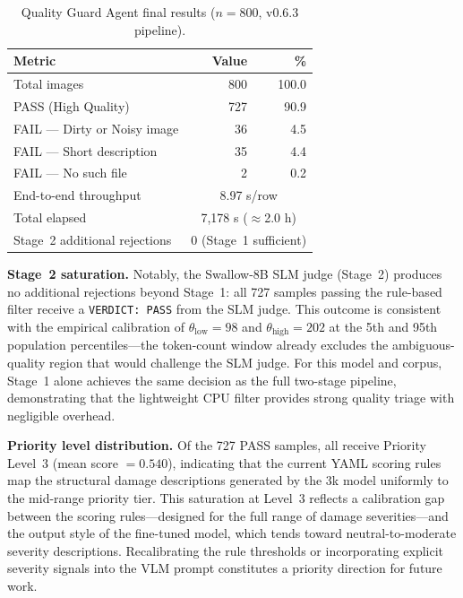 \documentclass[twocolumn]{article}
\begin{document}
\begin{table}[h]
\centering
\caption{Quality Guard Agent final results ($n=800$, v0.6.3 pipeline).}
\label{tab:qg_final}
\setlength{\tabcolsep}{4pt}
\begin{tabular}{lrr}
\toprule
\textbf{Metric} & \textbf{Value} & \textbf{\%} \\
\midrule
Total images                    & 800 & 100.0 \\
PASS (High Quality)             & 727 &  90.9 \\
FAIL --- Dirty or Noisy image   &  36 &   4.5 \\
FAIL --- Short description      &  35 &   4.4 \\
FAIL --- No such file           &   2 &   0.2 \\
\midrule
End-to-end throughput & \multicolumn{2}{c}{8.97 s/row} \\
Total elapsed         & \multicolumn{2}{c}{7{,}178 s ($\approx$2.0 h)} \\
Stage~2 additional rejections & \multicolumn{2}{c}{0 (Stage~1 sufficient)} \\
\bottomrule
\end{tabular}
\end{table}

\textbf{Stage~2 saturation.}
Notably, the Swallow-8B SLM judge (Stage~2) produces no additional
rejections beyond Stage~1: all 727 samples passing the rule-based
filter receive a \texttt{VERDICT: PASS} from the SLM judge.
This outcome is consistent with the empirical calibration of
$\theta_{\text{low}}=98$ and $\theta_{\text{high}}=202$ at the
5th and 95th population percentiles---the token-count window already
excludes the ambiguous-quality region that would challenge the SLM judge.
For this model and corpus, Stage~1 alone achieves the same decision
as the full two-stage pipeline, demonstrating that the lightweight
CPU filter provides strong quality triage with negligible overhead.

\textbf{Priority level distribution.}
Of the 727 PASS samples, all receive Priority Level~3
(mean score $= 0.540$), indicating that the current YAML scoring
rules map the structural damage descriptions generated by the 3k model
uniformly to the mid-range priority tier.
This saturation at Level~3 reflects a calibration gap between the
scoring rules---designed for the full range of damage severities---and
the output style of the fine-tuned model, which tends toward
neutral-to-moderate severity descriptions.
Recalibrating the rule thresholds or incorporating explicit severity
signals into the VLM prompt constitutes a priority direction for
future work.
\end{document}
